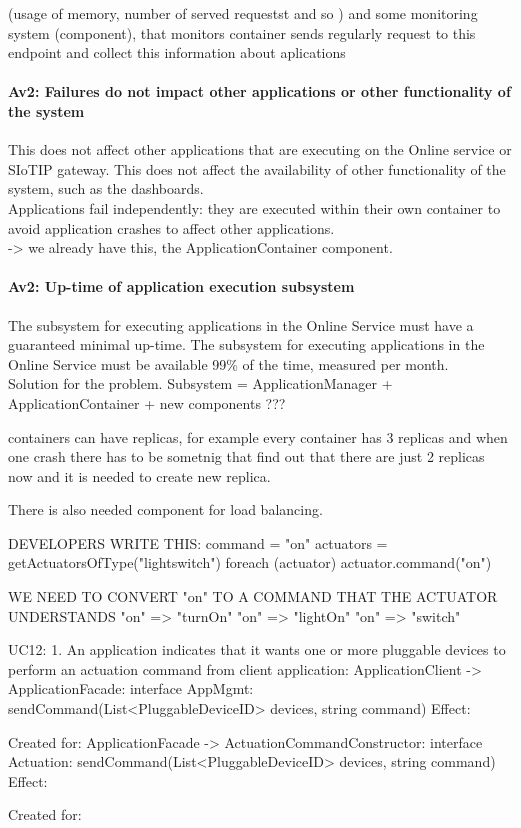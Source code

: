         (usage of memory, number of served requestst and so ) and some monitoring
        system (component), that monitors container sends regularly request to this endpoint
        and  collect this information about aplications

    \paragraph{Av2: Failures do not impact other applications or other functionality of the system}
        This does not affect other applications that are executing on the Online
        service or SIoTIP gateway. This does not affect the availability of
        other functionality of the system, such as the dashboards. \\
        Applications fail independently: they are executed within their own
        container to avoid application crashes to affect other applications.\\
       -> we already have this, the ApplicationContainer component.

    \paragraph{Av2: Up-time of application execution subsystem}
        The subsystem for executing applications in the Online Service must
        have a guaranteed minimal up-time. The subsystem for executing
        applications in the Online Service must be available
        99\% of the time, measured per month. \\
        Solution for the problem.
        Subsystem = ApplicationManager + ApplicationContainer + new components ???

        containers can have replicas, for example every container has 3 replicas and
        when one crash  there has to be sometnig that find out that there are
        just 2 replicas now and it is needed to create new replica.

        There is also needed component for load balancing.


        DEVELOPERS WRITE THIS: command = "on"
        actuators = getActuatorsOfType("lightswitch")
        foreach (actuator) {
            actuator.command("on")
        }

        WE NEED TO CONVERT "on" TO A COMMAND THAT THE ACTUATOR UNDERSTANDS
        "on" => "turnOn"
        "on" => "lightOn"
        "on" => "switch"

        UC12:
            1. An application indicates that it wants one or more pluggable devices to perform an actuation command
                from client application:
                    ApplicationClient -> ApplicationFacade:           interface AppMgmt:   sendCommand(List<PluggableDeviceID> devices, string command)
                        Effect:
                        \item Created for:
                    ApplicationFacade -> ActuationCommandConstructor: interface Actuation: sendCommand(List<PluggableDeviceID> devices, string command)
                        Effect:
                        \item Created for:

